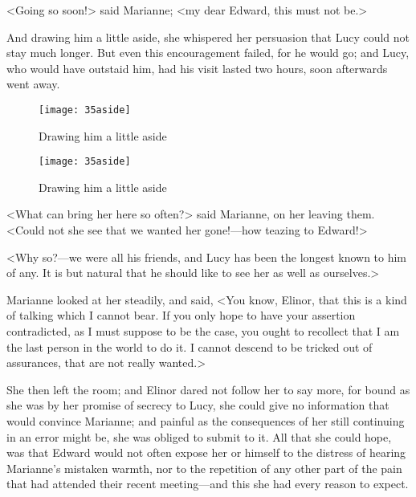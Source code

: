<Going so soon!> said Marianne; <my dear Edward, this must not be.>

And drawing him a little aside, she whispered her persuasion that Lucy could not stay much longer. But even this encouragement failed, for he would go; and Lucy, who would have outstaid him, had his visit lasted two hours, soon afterwards went away.

\begin{letter}
\begin{figure}[tbph]
\centering
\texttt{[image: 35aside]}
\caption{Drawing him a little aside}
\end{figure}
\end{letter}
\begin{a4}
\begin{figure}[tbph]
\centering
\texttt{[image: 35aside]}
\caption{Drawing him a little aside}
\end{figure}
\end{a4}

<What can bring her here so often?> said Marianne, on her leaving them. <Could not she see that we wanted her gone!—how teazing to Edward!>

<Why so?—we were all his friends, and Lucy has been the longest known to him of any. It is but natural that he should like to see her as well as ourselves.>

Marianne looked at her steadily, and said, <You know, Elinor, that this is a kind of talking which I cannot bear. If you only hope to have your assertion contradicted, as I must suppose to be the case, you ought to recollect that I am the last person in the world to do it. I cannot descend to be tricked out of assurances, that are not really wanted.>

She then left the room; and Elinor dared not follow her to say more, for bound as she was by her promise of secrecy to Lucy, she could give no information that would convince Marianne; and painful as the consequences of her still continuing in an error might be, she was obliged to submit to it. All that she could hope, was that Edward would not often expose her or himself to the distress of hearing Marianne's mistaken warmth, nor to the repetition of any other part of the pain that had attended their recent meeting—and this she had every reason to expect.